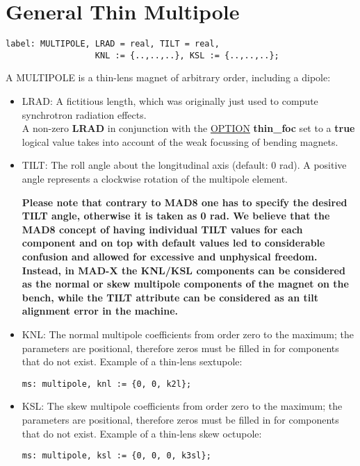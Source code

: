 
\section{General Thin Multipole}
\label{sec:multipole}

\begin{verbatim}
label: MULTIPOLE, LRAD = real, TILT = real,
                  KNL := {..,..,..}, KSL := {..,..,..};
\end{verbatim} 

A MULTIPOLE is a thin-lens magnet of arbitrary order, including a dipole: 
\begin{itemize}
    \item LRAD: A fictitious length, which was originally just used to
      compute synchrotron radiation effects. \\
      A non-zero \textbf{ LRAD } in conjunction  with the
      \href{../control/general.html#option}{OPTION}\textbf{ thin\_foc }
      set to a \textbf{ true } logical value takes into account of the
      weak focussing of bending magnets.  
    \item TILT: The roll angle about the longitudinal axis (default: 0
      rad). A positive angle represents a clockwise rotation of the
      multipole element.   

      \textbf{  Please note that contrary to MAD8 one has to specify the
        desired TILT angle, otherwise it is taken as 0 rad. We believe
        that the MAD8 concept of having individual TILT values for each
        component and on top with default values led to considerable
        confusion and allowed for excessive and unphysical
        freedom. Instead, in MAD-X the KNL/KSL components can be
        considered as the normal or skew multipole components of the
        magnet on the bench, while the TILT attribute can be considered
        as an tilt alignment error in the machine. } 

    \item KNL: The normal multipole coefficients from order zero to the
      maximum; the parameters are positional, therefore zeros must be
      filled in for components that do not exist. Example of a thin-lens
      sextupole:  
\begin{verbatim}
ms: multipole, knl := {0, 0, k2l};
\end{verbatim}

   \item KSL: The skew multipole coefficients from order zero to the
     maximum; the parameters are positional, therefore zeros must be
     filled in for components that do not exist. Example of a thin-lens
     skew octupole:  
\begin{verbatim}
ms: multipole, ksl := {0, 0, 0, k3sl};
\end{verbatim}

\end{itemize} 

